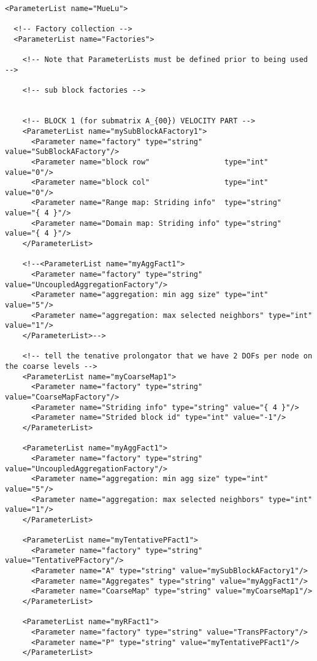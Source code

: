 \documentclass[10pt,fleqn]{book}
\begin{document}
\begin{lstlisting}
<ParameterList name="MueLu">

  <!-- Factory collection -->
  <ParameterList name="Factories">

    <!-- Note that ParameterLists must be defined prior to being used -->

    <!-- sub block factories -->

    
    <!-- BLOCK 1 (for submatrix A_{00}) VELOCITY PART -->
    <ParameterList name="mySubBlockAFactory1">
      <Parameter name="factory" type="string" value="SubBlockAFactory"/>
      <Parameter name="block row"                 type="int"     value="0"/>
      <Parameter name="block col"                 type="int"     value="0"/>
      <Parameter name="Range map: Striding info"  type="string"  value="{ 4 }"/>
      <Parameter name="Domain map: Striding info" type="string"  value="{ 4 }"/>
    </ParameterList>

    <!--<ParameterList name="myAggFact1">
      <Parameter name="factory" type="string" value="UncoupledAggregationFactory"/>
      <Parameter name="aggregation: min agg size" type="int" value="5"/>
      <Parameter name="aggregation: max selected neighbors" type="int" value="1"/>
    </ParameterList>-->

    <!-- tell the tenative prolongator that we have 2 DOFs per node on the coarse levels -->
    <ParameterList name="myCoarseMap1">
      <Parameter name="factory" type="string" value="CoarseMapFactory"/>
      <Parameter name="Striding info" type="string" value="{ 4 }"/>
      <Parameter name="Strided block id" type="int" value="-1"/>
    </ParameterList>

    <ParameterList name="myAggFact1">
      <Parameter name="factory" type="string" value="UncoupledAggregationFactory"/>
      <Parameter name="aggregation: min agg size" type="int" value="5"/>
      <Parameter name="aggregation: max selected neighbors" type="int" value="1"/>
    </ParameterList>
    
    <ParameterList name="myTentativePFact1">
      <Parameter name="factory" type="string" value="TentativePFactory"/>
      <Parameter name="A" type="string" value="mySubBlockAFactory1"/>
      <Parameter name="Aggregates" type="string" value="myAggFact1"/>
      <Parameter name="CoarseMap" type="string" value="myCoarseMap1"/>
    </ParameterList>

    <ParameterList name="myRFact1">
      <Parameter name="factory" type="string" value="TransPFactory"/>
      <Parameter name="P" type="string" value="myTentativePFact1"/>
    </ParameterList>
    

\end{lstlisting}
\end{document}
